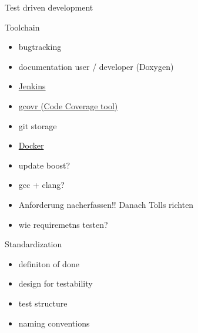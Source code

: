 \documentclass{beamer}
\begin{document}
    \begin{frame}{Test driven development}
        \centering
    \end{frame}

    \begin{frame}{Toolchain}
        \begin{itemize}
            \item bugtracking
            \item documentation user / developer (Doxygen)
            \item \href{https://www.jenkins.io/doc/}{Jenkins}
            \item \href{https://www.gcovr.com/en/stable/guide.html}{gcovr (Code Coverage tool)}
            \item git storage
            \item \href{https://docs.docker.com/}{Docker}
            \item update boost?
            \item gcc + clang?
            \item Anforderung nacherfassen!! Danach Tolls richten
            \item wie requiremetns testen?
        \end{itemize}
    \end{frame}

    \begin{frame}{Standardization}
        \begin{itemize}
            \item definiton of done
            \item design for testability
            \item test structure
            \item naming conventions
        \end{itemize}
    \end{frame}
\end{document}
